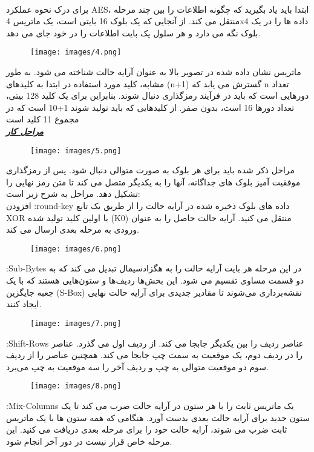 \\
برای درک نحوه عملکرد AES، ابتدا باید یاد بگیرید که چگونه اطلاعات را بین چند مرحله منتقل می کند. از آنجایی که یک بلوک 16 بایتی است، یک ماتریس 4x4 داده ها را در یک بلوک نگه می دارد و هر سلول یک بایت اطلاعات را در خود جای می دهد.
\begin{figure}[H]
    \centering
    \texttt{[image: images/4.png]}
\end{figure}
ماتریس نشان داده شده در تصویر بالا به عنوان آرایه حالت شناخته می شود. به طور مشابه، کلید مورد استفاده در ابتدا به کلیدهای (n+1) گسترش می یابد که n تعداد دورهایی است که باید در فرآیند رمزگذاری دنبال شوند. بنابراین برای یک کلید 128 بیتی، تعداد دورها 16 است، بدون صفر. از کلیدهایی که باید تولید شوند 1+10 است که در مجموع 11 کلید است
\\
\textit{\textbf{\underline{مراحل کار}}}
\\
\begin{figure}[H]
    \centering
    \texttt{[image: images/5.png]}
\end{figure}
مراحل ذکر شده باید برای هر بلوک به صورت متوالی دنبال شود. پس از رمزگذاری موفقیت آمیز بلوک های جداگانه، آنها را به یکدیگر متصل می کند تا متن رمز نهایی را تشکیل دهد. مراحل به شرح زیر است:
\\
افزودن :round-key داده های بلوک ذخیره شده در آرایه حالت را از طریق یک تابع XOR با اولین کلید تولید شده (K0) منتقل می کنید. آرایه حالت حاصل را به عنوان ورودی به مرحله بعدی ارسال می کند.
\begin{figure}[H]
    \centering
    \texttt{[image: images/6.png]}
\end{figure}
:Sub-Bytes در این مرحله هر بایت آرایه حالت را به هگزادسیمال تبدیل می کند که به دو قسمت مساوی تقسیم می شود. این بخش‌ها ردیف‌ها و ستون‌هایی هستند که با یک جعبه جایگزین (S-Box) نقشه‌برداری می‌شوند تا مقادیر جدیدی برای آرایه حالت نهایی ایجاد کنند.
\begin{figure}[H]
    \centering
    \texttt{[image: images/7.png]}
\end{figure}
:Shift-Rows عناصر ردیف را بین یکدیگر جابجا می کند. از ردیف اول می گذرد. عناصر را در ردیف دوم، یک موقعیت به سمت چپ جابجا می کند. همچنین عناصر را از ردیف سوم دو موقعیت متوالی به چپ و ردیف آخر را سه موقعیت به چپ می‌برد.
\begin{figure}[H]
    \centering
    \texttt{[image: images/8.png]}
\end{figure}
:Mix-Columns یک ماتریس ثابت را با هر ستون در آرایه حالت ضرب می کند تا یک ستون جدید برای آرایه حالت بعدی بدست آورد. هنگامی که همه ستون ها با یک ماتریس ثابت ضرب می شوند، آرایه حالت خود را برای مرحله بعدی دریافت می کنید. این مرحله خاص قرار نیست در دور آخر انجام شود.

